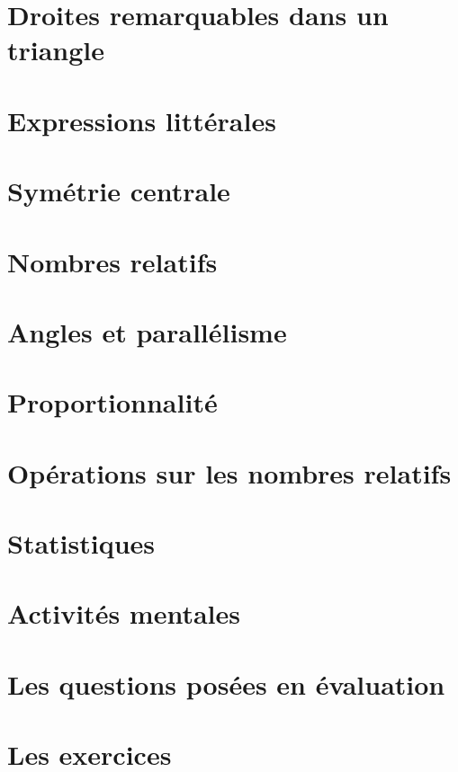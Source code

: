 \documentclass[a4paper,10pt]{book}
\begin{document}
\chapter{Droites remarquables dans un triangle}


\chapter{Expressions littérales}


\chapter{Symétrie centrale}


\chapter{Nombres relatifs}


\chapter{Angles et parallélisme}


\chapter{Proportionnalité}



\chapter{Opérations sur les nombres relatifs}


\chapter{Statistiques}


\chapter{Activités mentales}


\chapter{Les questions posées en évaluation}


\chapter{Les exercices}

\end{document}
